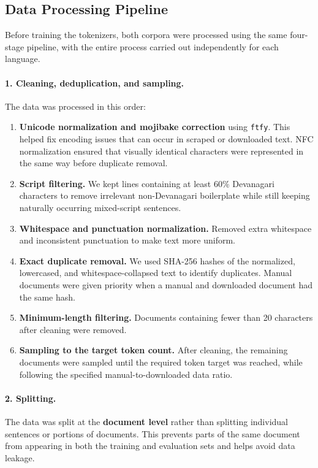 \documentclass[10pt,a4paper]{article}
\begin{document}
\subsection{Data Processing Pipeline}
Before training the tokenizers, both corpora were processed using the
same four-stage pipeline, with the entire process carried out
independently for each language.

\paragraph{1. Cleaning, deduplication, and sampling.}
The data was processed in this order:

\begin{enumerate}
\item \textbf{Unicode normalization and mojibake correction} using
\texttt{ftfy}. This helped fix encoding issues that can occur in
scraped or downloaded text. NFC normalization ensured that
visually identical characters were represented in the same way before
duplicate removal.

\item \textbf{Script filtering.} We kept lines containing at least
60\% Devanagari characters to remove irrelevant non-Devanagari
boilerplate while still keeping naturally occurring mixed-script
sentences.

\item \textbf{Whitespace and punctuation normalization.} Removed extra
whitespace and inconsistent punctuation to make text more uniform.

\item \textbf{Exact duplicate removal.} We used SHA-256 hashes of the
normalized, lowercased, and whitespace-collapsed text to identify
duplicates. Manual documents were given priority when a manual and
downloaded document had the same hash.

\item \textbf{Minimum-length filtering.} Documents containing fewer
than 20 characters after cleaning were removed.

\item \textbf{Sampling to the target token count.} After cleaning, the
remaining documents were sampled until the required token target was
reached, while following the specified manual-to-downloaded data ratio.
\end{enumerate}

\paragraph{2. Splitting.}
The data was split at the \textbf{document level} rather than splitting
individual sentences or portions of documents. This prevents parts of
the same document from appearing in both the training and evaluation
sets and helps avoid data leakage.
\end{document}
